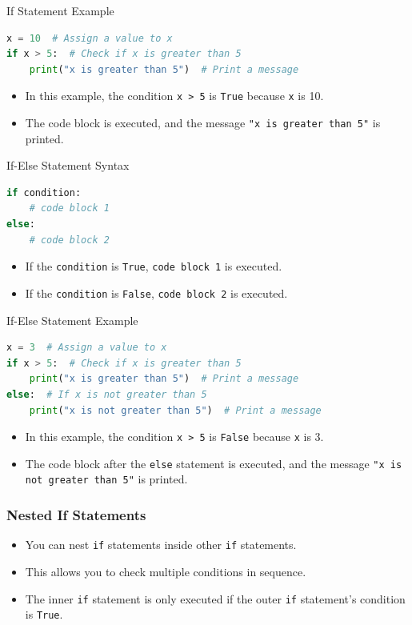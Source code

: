 \begin{frame}[fragile]{If Statement Example}
    \begin{lstlisting}[language=Python]
x = 10  # Assign a value to x
if x > 5:  # Check if x is greater than 5
    print("x is greater than 5")  # Print a message
    \end{lstlisting}
    \begin{itemize}
        \item In this example, the condition \texttt{x > 5} is \texttt{True} because \texttt{x} is 10.
        \item The code block is executed, and the message \texttt{"x is greater than 5"} is printed.
    \end{itemize}
\end{frame}

\begin{frame}[fragile]{If-Else Statement Syntax}
    \begin{lstlisting}[language=Python]
if condition:
    # code block 1
else:  
    # code block 2
    \end{lstlisting}
    \begin{itemize}
        \item If the \texttt{condition} is \texttt{True}, \texttt{code block 1} is executed.
        \item If the \texttt{condition} is \texttt{False}, \texttt{code block 2} is executed.
    \end{itemize}
\end{frame}     


\begin{frame}[fragile]{If-Else Statement Example}
    \begin{lstlisting}[language=Python]
x = 3  # Assign a value to x
if x > 5:  # Check if x is greater than 5
    print("x is greater than 5")  # Print a message
else:  # If x is not greater than 5
    print("x is not greater than 5")  # Print a message
    \end{lstlisting}
    \begin{itemize}
        \item In this example, the condition \texttt{x > 5} is \texttt{False} because \texttt{x} is 3.
        \item The code block after the \texttt{else} statement is executed, and the message \texttt{"x is not greater than 5"} is printed.
    \end{itemize}
\end{frame}

\begin{frame}
    \frametitle{Nested If Statements}
    \begin{itemize}
        \item You can nest \texttt{if} statements inside other \texttt{if} statements.
        \item This allows you to check multiple conditions in sequence.
        \item The inner \texttt{if} statement is only executed if the outer \texttt{if} statement's condition is \texttt{True}.
    \end{itemize}
\end{frame}

